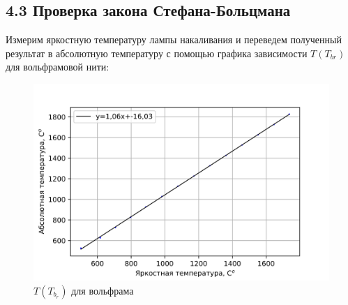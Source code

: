 \documentclass[a4paper,12pt]{report}
\begin{document}
\subsection*{4.3 Проверка закона Стефана-Больцмана}
Измерим яркостную температуру лампы накаливания и переведем полученный результат в абсолютную температуру с помощью графика зависимости $T(T_{br})$ для вольфрамовой нити:

\begin{figure}[H]
    \centering
    \includegraphics[width=14cm]{T(T_yar).png}
    \caption{$T(T_b_r)$ для вольфрама}
    \label{fig:vac}
\end{figure}
\end{document}

